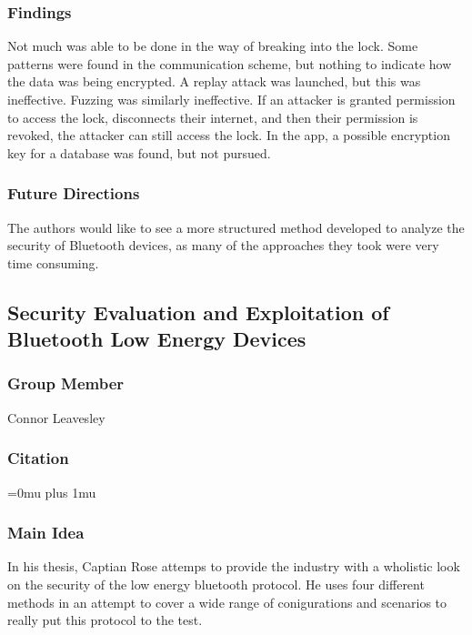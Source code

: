 \subsubsection{Findings}

\noindent
Not much was able to be done in the way of breaking into the lock. Some patterns were found in the communication scheme, but nothing to indicate how the data was being encrypted. A replay attack was launched, but this was ineffective. Fuzzing was similarly ineffective. If an attacker is granted permission to access the lock, disconnects their internet, and then their permission is revoked, the attacker can still access the lock. In the app, a possible encryption key for a database was found, but not pursued. 

\subsubsection{Future Directions}

\noindent
The authors would like to see a more structured method developed to analyze the security of Bluetooth devices, as many of the approaches they took were very time consuming. 

\subsection{Security Evaluation and Exploitation of Bluetooth Low Energy Devices}

\subsubsection{Group Member}

\noindent
Connor Leavesley

\noindent
\subsubsection{Citation}

\Urlmuskip=0mu plus 1mu\relax
{}

\subsubsection{Main Idea}

\noindent
In his thesis, Captian Rose attemps to provide the industry with a wholistic look on the security of the low energy bluetooth protocol. He uses four different methods in an attempt to cover a wide range of conigurations and scenarios to really put this protocol to the test.

